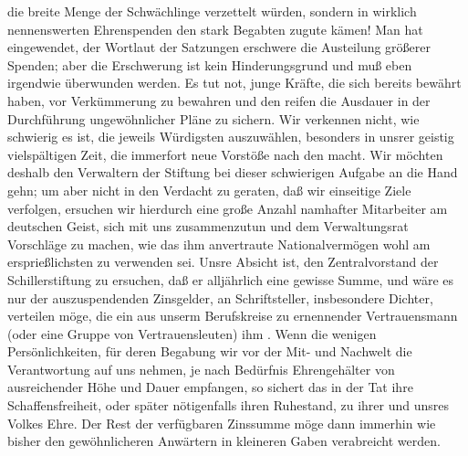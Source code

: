 \begin{ledgroupsized}[t]{13cm}
                    die breite Menge der Schwächlinge verzettelt würden, sondern in wirklich
                    nennenswerten Ehrenspenden den stark Begabten zugute kämen! Man hat eingewendet,
                    der Wortlaut der Satzungen erschwere die Austeilung größerer Spenden; aber die
                    Erschwerung ist kein Hinderungsgrund und muß eben irgendwie überwunden werden.
                    Es tut not, junge Kräfte, die sich bereits bewährt haben, vor Verkümmerung zu
                    bewahren und den reifen die Ausdauer in der Durchführung ungewöhnlicher Pläne zu
                    sichern.\pend
           \pstart
           Wir verkennen nicht, wie schwierig es ist, die jeweils Würdigsten auszuwählen,
                    besonders in unsrer geistig vielspältigen Zeit, die immerfort neue Vorstöße nach
                    den  macht. Wir möchten
                    deshalb den Verwaltern der Stiftung
                    bei dieser schwierigen Aufgabe an die Hand gehn; um aber nicht in den Verdacht
                    zu geraten, daß wir einseitige Ziele verfolgen, ersuchen wir hierdurch eine
                    große Anzahl namhafter Mitarbeiter am deutschen Geist, sich mit uns
                    zusammenzutun und dem Verwaltungsrat Vorschläge zu {\pb}machen, wie das ihm anvertraute Nationalvermögen wohl am ersprießlichsten zu
                    verwenden sei.\pend
           \pstart
           Unsre Absicht ist, den Zentralvorstand der Schillerstiftung zu ersuchen, daß er alljährlich eine gewisse Summe,
                    und wäre es nur  der auszuspendenden
                    Zinsgelder, an  Schriftsteller,
                    insbesondere Dichter, verteilen möge, die ein aus unserm Berufskreise zu
                    ernennender Vertrauensmann (oder eine Gruppe von Vertrauensleuten) ihm . Wenn die wenigen
                    Persönlichkeiten, für deren Begabung wir vor der Mit- und Nachwelt die
                    Verantwortung auf uns nehmen, je nach Bedürfnis Ehrengehälter von ausreichender
                    Höhe und Dauer empfangen, so sichert das in der Tat ihre Schaffensfreiheit, oder
                    später nötigenfalls ihren Ruhestand, zu ihrer und unsres Volkes Ehre. Der Rest
                    der verfügbaren Zinssumme möge dann immerhin wie bisher den gewöhnlicheren
                    Anwärtern in kleineren Gaben verabreicht werden.\pend

\end{ledgroupsized}

